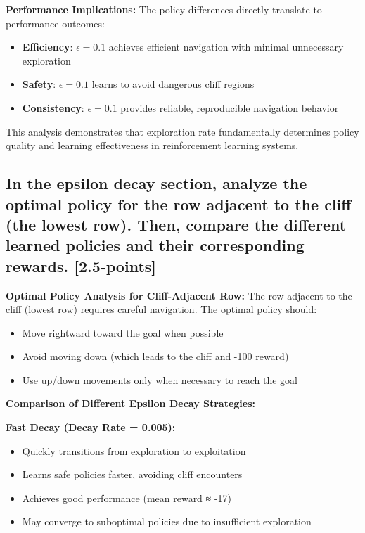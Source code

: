 \documentclass[12pt]{article}
\begin{document}
{{{\textbf{Performance Implications:}
The policy differences directly translate to performance outcomes:
\begin{itemize}
    \item \textbf{Efficiency}: $\epsilon = 0.1$ achieves efficient navigation with minimal unnecessary exploration
    \item \textbf{Safety}: $\epsilon = 0.1$ learns to avoid dangerous cliff regions
    \item \textbf{Consistency}: $\epsilon = 0.1$ provides reliable, reproducible navigation behavior
\end{itemize}

This analysis demonstrates that exploration rate fundamentally determines policy quality and learning effectiveness in reinforcement learning systems.

\subsection{In the epsilon decay section, analyze the optimal policy for the row adjacent to the cliff (the lowest row). Then, compare the different learned policies and their corresponding rewards. [2.5-points]}

\textbf{Optimal Policy Analysis for Cliff-Adjacent Row:}
The row adjacent to the cliff (lowest row) requires careful navigation. The optimal policy should:
\begin{itemize}
    \item Move rightward toward the goal when possible
    \item Avoid moving down (which leads to the cliff and -100 reward)
    \item Use up/down movements only when necessary to reach the goal
\end{itemize}

\textbf{Comparison of Different Epsilon Decay Strategies:}

\textbf{Fast Decay (Decay Rate = 0.005):}
\begin{itemize}
    \item Quickly transitions from exploration to exploitation
    \item Learns safe policies faster, avoiding cliff encounters
    \item Achieves good performance (mean reward ≈ -17)
    \item May converge to suboptimal policies due to insufficient exploration
\end{itemize}

}}}
\end{document}
